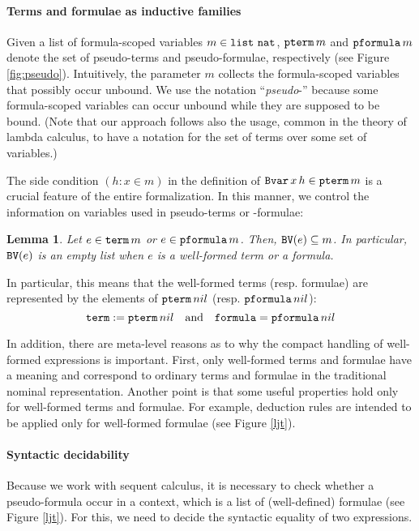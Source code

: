 \documentclass{svjour3}                     %
\newtheorem{lem}[thm]{Lemma}
\newcommand{\tm}{\subseteq}
\newcommand{\tBvar}{\textup{\tt Bvar}}
\newcommand{\tnat}{\textup{\tt nat}}
\newcommand{\tpterm}{\textup{\tt pterm}}
\newcommand{\tpfml}{\textup{\tt pformula}}
\newcommand{\tterm}{\textup{\tt term}}
\newcommand{\tfml}{\textup{\tt formula}}
\newcommand{\tPH}{\textup{\tt BV}}
\newcommand{\tlist}{\textup{\tt list}}
\begin{document}
\paragraph{\bf Terms and formulae as inductive families}
Given a list of formula-scoped variables $m \in \tlist\,\, \tnat$, $\tpterm\, m$ and $\tpfml\, m$ denote the set of pseudo-terms and pseudo-formulae, respectively (see Figure \ref{fig:pseudo}). Intuitively, the parameter $m$ collects the formula-scoped variables that possibly occur unbound. We use the notation ``\textit{pseudo}-'' because some formula-scoped variables can occur unbound while they are supposed to be bound.
(Note that our approach follows also the usage, common in the theory of lambda calculus, to have a notation for the set of terms over some set of variables.)

The side condition $(h : x \in m)$ in the definition of $\tBvar\, x\, h \in \tpterm\, m$ is a crucial feature of the entire formalization. In this manner, we control the information on variables used in pseudo-terms or -formulae:

\begin{lem}\label{ph-property}
  Let $e \in \tterm\, m$ or $e \in \tpfml\, m$. Then, $\tPH(e) \tm m$. In particular, $\tPH(e)$ is an empty list when $e$ is a well-formed term or a formula.
\end{lem}
In particular, this means that the well-formed terms (resp. formulae) are represented by the elements of $\tpterm\, nil$ (resp. $\tpfml\, nil$):
\begin{equation*}
  \tterm :=  \tpterm\, nil\quad \text{and} \quad
  \tfml  = \tpfml\, nil
\end{equation*}

In addition, there are meta-level reasons as to why the compact handling of well-formed expressions is important. First, only well-formed terms and formulae have a meaning and correspond to ordinary terms and formulae in the traditional nominal representation. Another point is that some useful properties hold only for well-formed terms and formulae. For example, deduction rules are intended to be applied only for well-formed formulae (see Figure \ref{ljt}).


\paragraph{\bf Syntactic decidability}
Because we work with sequent calculus, it is necessary to check whether a pseudo-formula occur in a context, which is a list of (well-defined) formulae (see Figure \ref{ljt}). For this, we need to decide the syntactic equality of two expressions.
\end{document}
